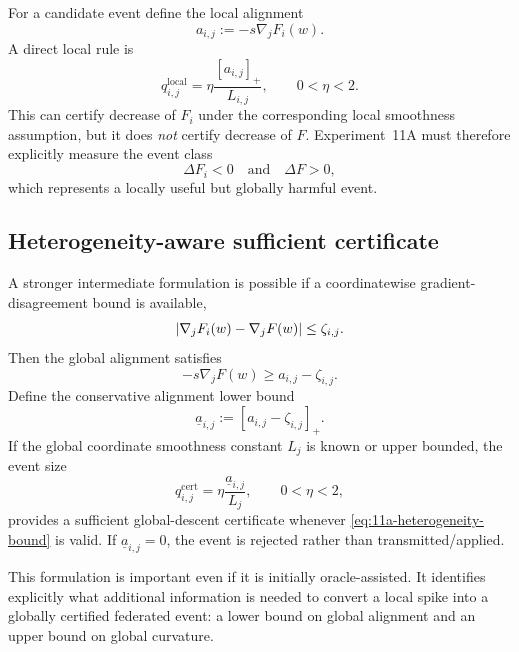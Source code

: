 For a candidate event define the local alignment
\begin{equation}
  a_{i,j}:=-s\nabla_jF_i(w).
\end{equation}
A direct local rule is
\begin{equation}
  q_{i,j}^{\mathrm{local}}
  =
  \eta\frac{[a_{i,j}]_+}{L_{i,j}},
  \qquad 0<\eta<2.
  \label{eq:11a-local-q}
\end{equation}
This can certify decrease of $F_i$ under the corresponding local smoothness assumption, but it does \emph{not} certify decrease of $F$. Experiment~11A must therefore explicitly measure the event class
\begin{equation}
  \boxed{\Delta F_i<0\quad\text{and}\quad\Delta F>0,}
\end{equation}
which represents a locally useful but globally harmful event.

\subsection{Heterogeneity-aware sufficient certificate}

A stronger intermediate formulation is possible if a coordinatewise gradient-disagreement bound is available,
\begin{equation}
  \left|\nabla_jF_i(w)-\nabla_jF(w)\right|\leq \zeta_{i,j}.
  \label{eq:11a-heterogeneity-bound}
\end{equation}
Then the global alignment satisfies
\begin{equation}
  -s\nabla_jF(w)
  \geq
  a_{i,j}-\zeta_{i,j}.
\end{equation}
Define the conservative alignment lower bound
\begin{equation}
  \underline a_{i,j}
  :=[a_{i,j}-\zeta_{i,j}]_+.
\end{equation}
If the global coordinate smoothness constant $L_j$ is known or upper bounded, the event size
\begin{equation}
  q_{i,j}^{\mathrm{cert}}
  =
  \eta\frac{\underline a_{i,j}}{L_j},
  \qquad 0<\eta<2,
  \label{eq:11a-certified-q}
\end{equation}
provides a sufficient global-descent certificate whenever \cref{eq:11a-heterogeneity-bound} is valid. If $\underline a_{i,j}=0$, the event is rejected rather than transmitted/applied.

This formulation is important even if it is initially oracle-assisted. It identifies explicitly what additional information is needed to convert a local spike into a globally certified federated event: a lower bound on global alignment and an upper bound on global curvature.

